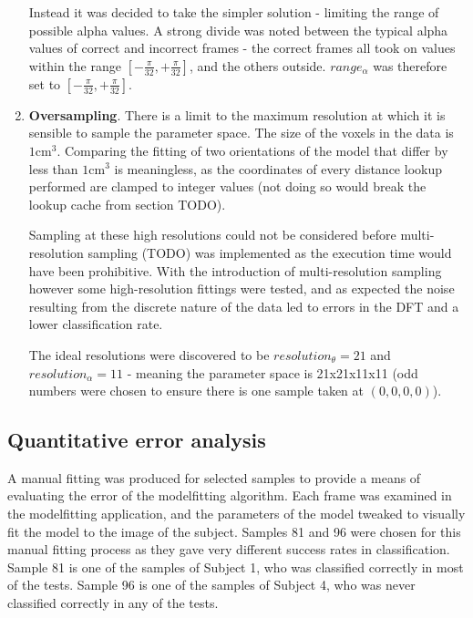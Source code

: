 \begin{enumerate}
		Instead it was decided to take the simpler solution - limiting the range of possible alpha values.
		A strong divide was noted between the typical alpha values of correct and incorrect frames - the correct frames all took on
		values within the range $\left[ -\frac{\pi}{32}, +\frac{\pi}{32}\right]$, and the others outside.
		$range_\alpha$ was therefore set to $\left[ -\frac{\pi}{32}, +\frac{\pi}{32}\right]$.
	
	\item \textbf{Oversampling}.
		There is a limit to the maximum resolution at which it is sensible to sample the parameter space.
		The size of the voxels in the data is $1\text{cm}^3$.
		Comparing the fitting of two orientations of the model that differ by less than $1\text{cm}^3$ is meaningless,
		as the coordinates of every distance lookup performed are clamped to integer values (not doing so would break
		the lookup cache from section TODO).
		
		Sampling at these high resolutions could not be considered before multi-resolution sampling (TODO) was implemented
		as the execution time would have been prohibitive.
		With the introduction of multi-resolution sampling however some high-resolution fittings were tested, and as expected
		the noise resulting from the discrete nature of the data led to errors in the DFT and a lower classification rate.
		
		The ideal resolutions were discovered to be $resolution_\theta = 21$ and $resolution_\alpha = 11$ - meaning the
		parameter space is 21x21x11x11 (odd numbers were chosen to ensure there is one sample taken at $(0, 0, 0, 0)$).
\end{enumerate}


\subsection{Quantitative error analysis}

A manual fitting was produced for selected samples to provide a means of evaluating the error of the modelfitting algorithm.
Each frame was examined in the modelfitting application, and the parameters of the model tweaked to visually fit the model to the image of the subject.
Samples 81 and 96 were chosen for this manual fitting process as they gave very different success rates in classification.
Sample 81 is one of the samples of Subject 1, who was classified correctly in most of the tests.
Sample 96 is one of the samples of Subject 4, who was never classified correctly in any of the tests.

